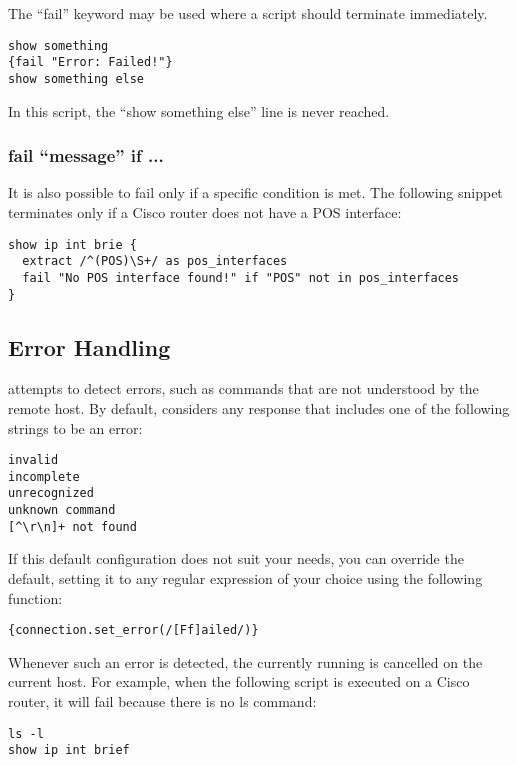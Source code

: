 The ``fail'' keyword may be used where a script should terminate immediately. 

\begin{lstlisting}
show something
{fail "Error: Failed!"}
show something else
\end{lstlisting}

In this script, the ``show something else'' line is never reached. 

\subsubsection{fail ``message'' if ...}

It is also possible to fail only if a specific condition is met. The 
following snippet terminates only if a Cisco router does not have a POS 
interface: 

\begin{lstlisting}
show ip int brie {
  extract /^(POS)\S+/ as pos_interfaces
  fail "No POS interface found!" if "POS" not in pos_interfaces
}
\end{lstlisting}


\subsection{Error Handling}

\product attempts to detect errors, such as commands that are not understood 
by the remote host. By default, \product considers any response that 
includes one of the following strings to be an error: 

\begin{lstlisting}
invalid
incomplete
unrecognized
unknown command
[^\r\n]+ not found
\end{lstlisting}

If this default configuration does not suit your needs, you can override the 
default, setting it to any regular expression of your choice using the 
following function: 

\begin{lstlisting}
{connection.set_error(/[Ff]ailed/)}
\end{lstlisting}

Whenever such an error is detected, the currently running \product is 
cancelled on the current host. For example, when the following script is 
executed on a Cisco router, it will fail because there is no ls command: 

\begin{lstlisting}
ls -l
show ip int brief
\end{lstlisting}

